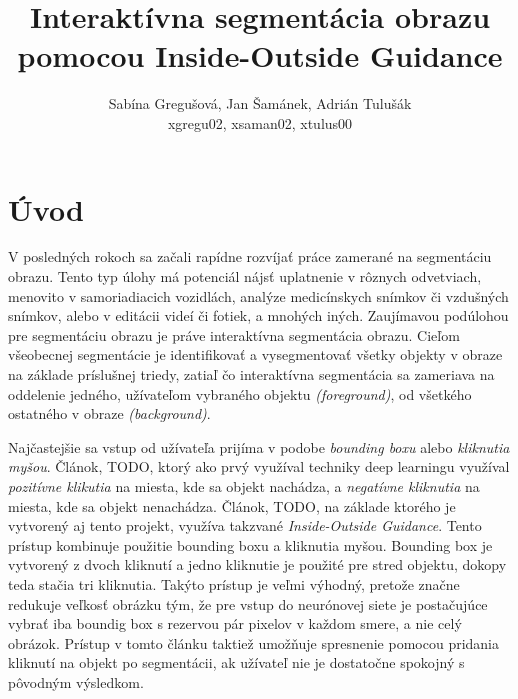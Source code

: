 \documentclass [11pt, a4paper, twocolumn]{article}
\begin{document}
\title{Interaktívna segmentácia obrazu pomocou Inside-Outside Guidance}
\author{Sabína Gregušová, Jan Šamánek, Adrián Tulušák\\xgregu02, xsaman02, xtulus00}
\date{}
\maketitle

\section{Úvod}
V posledných rokoch sa začali rapídne rozvíjať práce zamerané na segmentáciu obrazu. Tento typ úlohy má potenciál nájsť uplatnenie v rôznych odvetviach, menovito v samoriadiacich vozidlách, analýze medicínskych snímkov či vzdušných snímkov, alebo v editácii videí či fotiek, a mnohých iných. Zaujímavou podúlohou pre segmentáciu obrazu je práve interaktívna segmentácia obrazu. Cieľom všeobecnej segmentácie je identifikovať a vysegmentovať všetky objekty v obraze na základe príslušnej triedy, zatiaľ čo interaktívna segmentácia sa zameriava na oddelenie jedného, užívateľom vybraného objektu \textit{(foreground)}, od všetkého ostatného v obraze \textit{(background)}.

Najčastejšie sa vstup od užívateľa prijíma v podobe \textit{bounding boxu} alebo \textit{kliknutia myšou}. Článok, TODO, ktorý ako prvý využíval techniky deep learningu využíval \textit{pozitívne klikutia} na miesta, kde sa objekt nachádza, a \textit{negatívne kliknutia} na miesta, kde sa objekt nenachádza. Článok, TODO, na základe ktorého je vytvorený aj tento projekt, využíva takzvané \textit{Inside-Outside Guidance}. Tento prístup kombinuje použitie bounding boxu a kliknutia myšou. Bounding box je vytvorený z dvoch kliknutí a jedno kliknutie je použité pre stred objektu, dokopy teda stačia tri kliknutia. Takýto prístup je veľmi výhodný, pretože značne redukuje veľkosť obrázku tým, že pre vstup do neurónovej siete je postačujúce vybrať iba boundig box s rezervou pár pixelov v každom smere, a nie celý obrázok. Prístup v tomto článku taktiež umožňuje spresnenie pomocou pridania kliknutí na objekt po segmentácii, ak užívateľ nie je dostatočne spokojný s pôvodným výsledkom.
\end{document}
